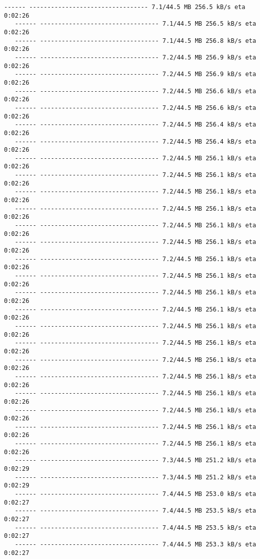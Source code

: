 \documentclass[11pt]{article}
\begin{document}
\begin{Verbatim}[commandchars=\\\{\}]
   ------ --------------------------------- 7.1/44.5 MB 256.5 kB/s eta 0:02:26
   ------ --------------------------------- 7.1/44.5 MB 256.5 kB/s eta 0:02:26
   ------ --------------------------------- 7.1/44.5 MB 256.8 kB/s eta 0:02:26
   ------ --------------------------------- 7.2/44.5 MB 256.9 kB/s eta 0:02:26
   ------ --------------------------------- 7.2/44.5 MB 256.9 kB/s eta 0:02:26
   ------ --------------------------------- 7.2/44.5 MB 256.6 kB/s eta 0:02:26
   ------ --------------------------------- 7.2/44.5 MB 256.6 kB/s eta 0:02:26
   ------ --------------------------------- 7.2/44.5 MB 256.4 kB/s eta 0:02:26
   ------ --------------------------------- 7.2/44.5 MB 256.4 kB/s eta 0:02:26
   ------ --------------------------------- 7.2/44.5 MB 256.1 kB/s eta 0:02:26
   ------ --------------------------------- 7.2/44.5 MB 256.1 kB/s eta 0:02:26
   ------ --------------------------------- 7.2/44.5 MB 256.1 kB/s eta 0:02:26
   ------ --------------------------------- 7.2/44.5 MB 256.1 kB/s eta 0:02:26
   ------ --------------------------------- 7.2/44.5 MB 256.1 kB/s eta 0:02:26
   ------ --------------------------------- 7.2/44.5 MB 256.1 kB/s eta 0:02:26
   ------ --------------------------------- 7.2/44.5 MB 256.1 kB/s eta 0:02:26
   ------ --------------------------------- 7.2/44.5 MB 256.1 kB/s eta 0:02:26
   ------ --------------------------------- 7.2/44.5 MB 256.1 kB/s eta 0:02:26
   ------ --------------------------------- 7.2/44.5 MB 256.1 kB/s eta 0:02:26
   ------ --------------------------------- 7.2/44.5 MB 256.1 kB/s eta 0:02:26
   ------ --------------------------------- 7.2/44.5 MB 256.1 kB/s eta 0:02:26
   ------ --------------------------------- 7.2/44.5 MB 256.1 kB/s eta 0:02:26
   ------ --------------------------------- 7.2/44.5 MB 256.1 kB/s eta 0:02:26
   ------ --------------------------------- 7.2/44.5 MB 256.1 kB/s eta 0:02:26
   ------ --------------------------------- 7.2/44.5 MB 256.1 kB/s eta 0:02:26
   ------ --------------------------------- 7.2/44.5 MB 256.1 kB/s eta 0:02:26
   ------ --------------------------------- 7.2/44.5 MB 256.1 kB/s eta 0:02:26
   ------ --------------------------------- 7.3/44.5 MB 251.2 kB/s eta 0:02:29
   ------ --------------------------------- 7.3/44.5 MB 251.2 kB/s eta 0:02:29
   ------ --------------------------------- 7.4/44.5 MB 253.0 kB/s eta 0:02:27
   ------ --------------------------------- 7.4/44.5 MB 253.5 kB/s eta 0:02:27
   ------ --------------------------------- 7.4/44.5 MB 253.5 kB/s eta 0:02:27
   ------ --------------------------------- 7.4/44.5 MB 253.3 kB/s eta 0:02:27

\end{Verbatim}
\end{document}
